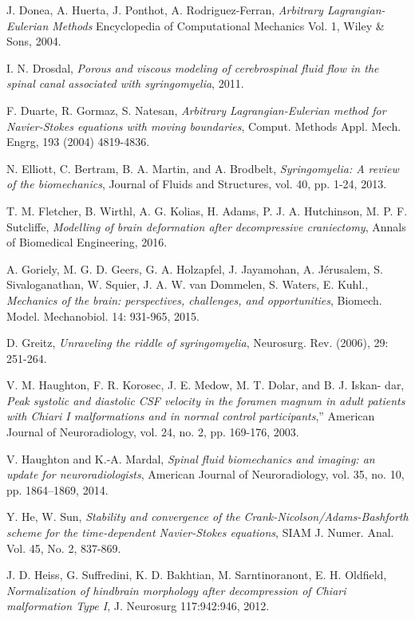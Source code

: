 \documentclass[a4paper,11pt,openright,twoside]{book}
\begin{document}
\begin{thebibliography}{100}
 J. Donea, A. Huerta, J. Ponthot, A. Rodriguez-Ferran, \emph{Arbitrary Lagrangian-Eulerian Methods} Encyclopedia of Computational Mechanics Vol. 1, Wiley \& Sons, 2004.

 I. N. Drosdal, \emph{Porous and viscous modeling of cerebrospinal fluid flow in the spinal canal associated with syringomyelia}, 2011.

 F. Duarte, R. Gormaz, S. Natesan, \emph{Arbitrary Lagrangian-Eulerian method for Navier-Stokes equations with moving boundaries}, Comput. Methods Appl. Mech. Engrg, 193 (2004) 4819-4836.

 N. Elliott, C. Bertram, B. A. Martin, and A. Brodbelt, \emph{Syringomyelia: A review of the biomechanics}, Journal of Fluids and Structures, vol. 40, pp. 1-24, 2013.


 T. M. Fletcher, B. Wirthl, A. G. Kolias, H. Adams, P. J. A. Hutchinson, M. P. F. Sutcliffe, \emph{Modelling of brain deformation after decompressive craniectomy}, Annals of Biomedical Engineering, 2016.

 A. Goriely, M. G. D. Geers, G. A. Holzapfel, J. Jayamohan, A. Jérusalem, S. Sivaloganathan, W. Squier, J. A. W. van Dommelen, S. Waters, E. Kuhl., \emph{Mechanics of the brain: perspectives, challenges, and opportunities}, Biomech. Model. Mechanobiol. 14: 931-965, 2015.


 D. Greitz, \emph{Unraveling the riddle of syringomyelia}, Neurosurg. Rev. (2006), 29: 251-264.

 V. M. Haughton, F. R. Korosec, J. E. Medow, M. T. Dolar, and B. J. Iskan- dar, \emph{Peak systolic and diastolic CSF velocity in the foramen magnum in adult patients with Chiari I malformations and in normal control participants},” American Journal of Neuroradiology, vol. 24, no. 2, pp. 169-176, 2003.

 V. Haughton and K.-A. Mardal, \emph{Spinal fluid biomechanics and imaging: an update for neuroradiologists}, American Journal of Neuroradiology, vol. 35, no. 10, pp. 1864–1869, 2014.


 Y. He, W. Sun, \emph{Stability and convergence of the Crank-Nicolson/Adams-Bashforth scheme for the time-dependent Navier-Stokes equations}, SIAM J. Numer. Anal. Vol. 45, No. 2, 837-869.

 J. D. Heiss, G. Suffredini, K. D. Bakhtian, M. Sarntinoranont, E. H. Oldfield, \emph{Normalization of hindbrain morphology after decompression of Chiari malformation Type I}, J. Neurosurg 117:942:946, 2012.



\end{thebibliography}
\end{document}
